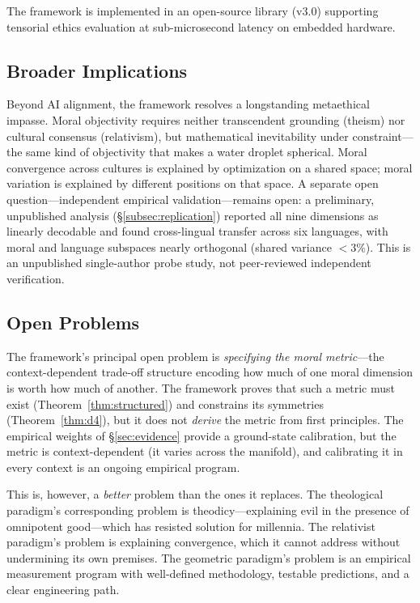 \documentclass[12pt]{article}
\theoremstyle{definition}
\theoremstyle{remark}
\begin{document}
The framework is implemented in an open-source library (v3.0) supporting tensorial ethics evaluation at sub-microsecond latency on embedded hardware.

\subsection{Broader Implications}

Beyond AI alignment, the framework resolves a longstanding metaethical impasse. Moral objectivity requires neither transcendent grounding (theism) nor cultural consensus (relativism), but mathematical inevitability under constraint---the same kind of objectivity that makes a water droplet spherical. Moral convergence across cultures is explained by optimization on a shared space; moral variation is explained by different positions on that space. A separate open question---independent empirical validation---remains open: a preliminary, unpublished analysis (\S\ref{subsec:replication}) reported all nine dimensions as linearly decodable and found cross-lingual transfer across six languages, with moral and language subspaces nearly orthogonal (shared variance $< 3\%$). This is an unpublished single-author probe study, not peer-reviewed independent verification.

\subsection{Open Problems}

The framework's principal open problem is \emph{specifying the moral metric}---the context-dependent trade-off structure encoding how much of one moral dimension is worth how much of another. The framework proves that such a metric must exist (Theorem~\ref{thm:structured}) and constrains its symmetries (Theorem~\ref{thm:d4}), but it does not \emph{derive} the metric from first principles. The empirical weights of \S\ref{sec:evidence} provide a ground-state calibration, but the metric is context-dependent (it varies across the manifold), and calibrating it in every context is an ongoing empirical program.

This is, however, a \emph{better} problem than the ones it replaces. The theological paradigm's corresponding problem is theodicy---explaining evil in the presence of omnipotent good---which has resisted solution for millennia. The relativist paradigm's problem is explaining convergence, which it cannot address without undermining its own premises. The geometric paradigm's problem is an empirical measurement program with well-defined methodology, testable predictions, and a clear engineering path.
\end{document}
